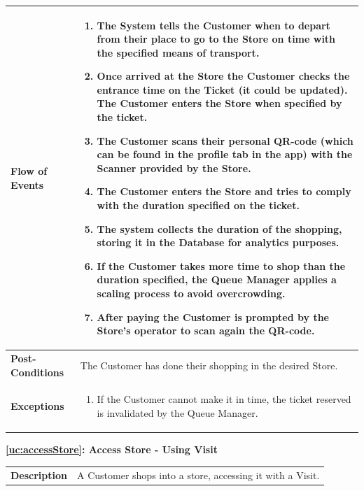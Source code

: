\documentclass[a4paper, 12pt, oneside]{article}
\begin{document}
\begin{enumerate}[labelindent=20pt, label={UC.\arabic*}, itemindent=1em,leftmargin=!]
\begin{tabularx}{\linewidth}{| l | X |}
	\hline
	\textbf{Flow of Events} & \parbox{0.7\textwidth}{	
		\begin{enumerate}
			\item The System tells the Customer when to depart from their place to go to the Store on time with the specified means of transport.
			\item Once arrived at the Store the Customer checks the entrance time on the Ticket (it could be updated). The Customer enters the Store when specified by the ticket.
			\item The Customer scans their personal QR-code (which can be found in the profile tab in the app) with the Scanner provided by the Store.
			\item The Customer enters the Store and tries to comply with the duration specified on the ticket.
			\item The system collects the duration of the shopping, storing it in the Database for analytics purposes.
			\item If the Customer takes more time to shop than the duration specified, the Queue Manager applies a scaling process to avoid overcrowding.
			\item After paying the Customer is prompted by the Store's operator to scan again the QR-code.
	\end{enumerate}}\\
	
	\hline
	\textbf{Post-Conditions} & The Customer has done their shopping in the desired Store.\\
	
	\hline
	\textbf{Exceptions} & \parbox{0.7\textwidth}{ \begin{enumerate}
			\item If the Customer cannot make it in time, the ticket reserved is invalidated by the Queue Manager.
		\end{enumerate}}\\

	\hline
	
\end{tabularx}

\begin{center}
{\textbf{\ref{uc:accessStore}: Access Store - Using Visit}}
\end{center}
\begin{tabularx}{\linewidth}{| l | X |}
	
	\hline
	\textbf{Description} & A Customer shops into a store, accessing it with a Visit.\\
	

\end{tabularx}
\end{enumerate}
\end{document}
